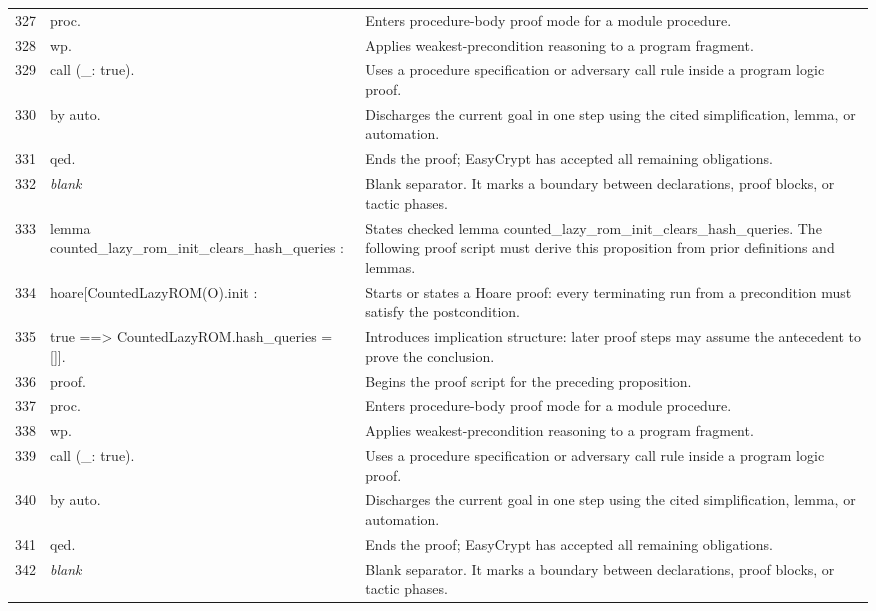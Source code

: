 \documentclass[10pt]{article}
\begin{document}
\begin{longtable}{r L{0.53\textwidth} L{0.37\textwidth}}
327 & {\ttfamily\scriptsize proc.} & Enters procedure-body proof mode for a module procedure. \\
328 & {\ttfamily\scriptsize wp.} & Applies weakest-precondition reasoning to a program fragment. \\
329 & {\ttfamily\scriptsize call (\_: true).} & Uses a procedure specification or adversary call rule inside a program logic proof. \\
330 & {\ttfamily\scriptsize by auto.} & Discharges the current goal in one step using the cited simplification, lemma, or automation. \\
331 & {\ttfamily\scriptsize qed.} & Ends the proof; EasyCrypt has accepted all remaining obligations. \\
332 & {\ttfamily\scriptsize \emph{blank}} & Blank separator.  It marks a boundary between declarations, proof blocks, or tactic phases. \\
333 & {\ttfamily\scriptsize lemma counted\_lazy\_rom\_init\_clears\_hash\_queries :} & States checked lemma counted\_lazy\_rom\_init\_clears\_hash\_queries.  The following proof script must derive this proposition from prior definitions and lemmas. \\
334 & {\ttfamily\scriptsize   hoare[CountedLazyROM(O).init :} & Starts or states a Hoare proof: every terminating run from a precondition must satisfy the postcondition. \\
335 & {\ttfamily\scriptsize     true ==> CountedLazyROM.hash\_queries = []].} & Introduces implication structure: later proof steps may assume the antecedent to prove the conclusion. \\
336 & {\ttfamily\scriptsize proof.} & Begins the proof script for the preceding proposition. \\
337 & {\ttfamily\scriptsize proc.} & Enters procedure-body proof mode for a module procedure. \\
338 & {\ttfamily\scriptsize wp.} & Applies weakest-precondition reasoning to a program fragment. \\
339 & {\ttfamily\scriptsize call (\_: true).} & Uses a procedure specification or adversary call rule inside a program logic proof. \\
340 & {\ttfamily\scriptsize by auto.} & Discharges the current goal in one step using the cited simplification, lemma, or automation. \\
341 & {\ttfamily\scriptsize qed.} & Ends the proof; EasyCrypt has accepted all remaining obligations. \\
342 & {\ttfamily\scriptsize \emph{blank}} & Blank separator.  It marks a boundary between declarations, proof blocks, or tactic phases. \\

\end{longtable}
\end{document}
